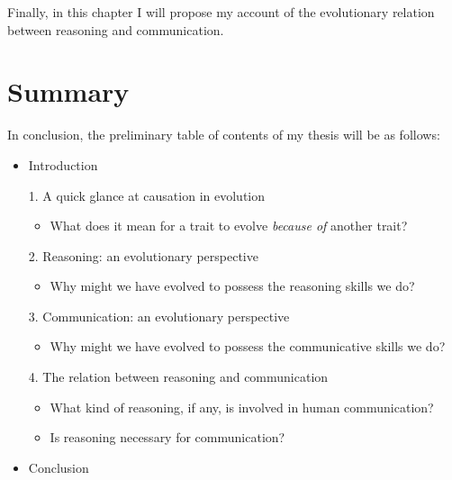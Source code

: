 \documentclass{article}
\begin{document}
Finally, in this chapter I will propose my account of the evolutionary relation between reasoning and communication.

\section*{Summary}

In conclusion, the preliminary table of contents of my thesis will be as follows:
\begin{itemize}
    \item Introduction
    \item[1.] A quick glance at causation in evolution
        \begin{itemize}
            \item What does it mean for a trait to evolve \emph{because of} another trait?
        \end{itemize}
    \item [2.] Reasoning: an evolutionary perspective
        \begin{itemize}
            \item Why might we have evolved to possess the reasoning skills we do?
        \end{itemize}
    \item [3.] Communication: an evolutionary perspective
        \begin{itemize}
            \item Why might we have evolved to possess the communicative skills we do?
        \end{itemize}
    \item [4.] The relation between reasoning and communication
        \begin{itemize}
            \item What kind of reasoning, if any, is involved in human communication?
            \item Is reasoning necessary for communication?
        \end{itemize}
    \item Conclusion
\end{itemize}

\pagebreak

\nocite{*}
\printbibliography[title=Preliminary bibliography]
\end{document}
